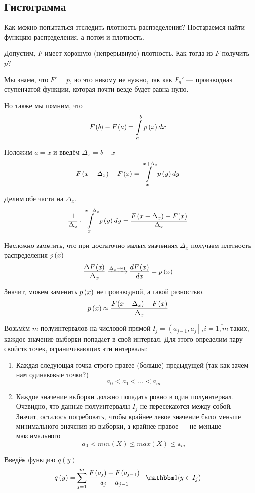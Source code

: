 \subsection{Гистограмма}
\label{subsection:histogram}
Как можно попытаться отследить плотность распределения?
Постараемся найти функцию распределения, а потом и плотность.

Допустим, $F$ имеет хорошую (непрерывную) плотность.
Как тогда из $F$ получить $p$?

Мы знаем, что $F'=p$, но это никому не нужно, так как $F_n'$ --- производная
ступенчатой функции, которая почти везде будет равна нулю.

Но также мы помним, что
$$F_{}\left(b\right)-F_{}\left(a\right)=\int\limits_a^b p\left(x\right) dx$$

Положим $a=x$ и введём $\Delta_x=b-x$
$$F_{}\left(x+\Delta_x\right)-F_{}\left(x\right)=\int\limits_x^{x+\Delta_x} p\left(y\right) dy$$

Делим обе части на $\Delta_x$.
$$\frac{1}{\Delta_x}\cdot\int\limits_x^{x+\Delta_x} p\left(y\right) dy
=\frac{F_{}\left(x+\Delta_x\right)-F_{}\left(x\right)}{\Delta_x}$$

Несложно заметить,
что при достаточно малых значениях $\Delta_x$
получаем плотность распределения $p\left(x\right)$
$$\frac{\Delta F_{}\left(x\right)}{\Delta_x}
\xrightarrow[]{\Delta_x\to 0}
\frac{dF_{}\left(x\right)}{dx}=p\left(x\right)$$

Значит, можем заменить $p\left(x\right)$ не производной, а такой разностью.
$$p\left(x\right)\approx\frac{F_{}\left(x+\Delta_x\right)-F_{}\left(x\right)}{\Delta_x}$$

Возьмём $m$ полуинтервалов на числовой прямой
$I_j=\left(a_{j-1},a_j\right], i=\overline{1,m}$
таких, каждое значение выборки попадает в свой интервал.
Для этого определим пару свойств точек, ограничивающих эти интервалы:
\begin{enumerate}
  \item Каждая следующая точка строго правее (больше) предыдущей
    (так как зачем нам одинаковые точки?)
    $$a_0<a_1<\dots<a_m$$
  \item Каждое значение выборки должно попадать ровно в один полуинтервал.
    Очевидно, что данные полуинтервалы $I_j$ не пересекаются между собой.
    Значит, осталось потребовать, чтобы
    крайнее левое значение было меньше минимального значения из выборки,
    а крайнее правое --- не меньше максимального
    $$a_0<min\left(X\right)\le max\left(X\right)\le a_m$$
\end{enumerate}

Введём функцию $q\left(y\right)$
$$q\left(y\right)
=\sum_{j=1}^m \frac{\cdf{a_j}-\cdf{a_{j-1}}}{a_j-a_{j-1}}
  \cdot\indicator{y\in I_j}$$

